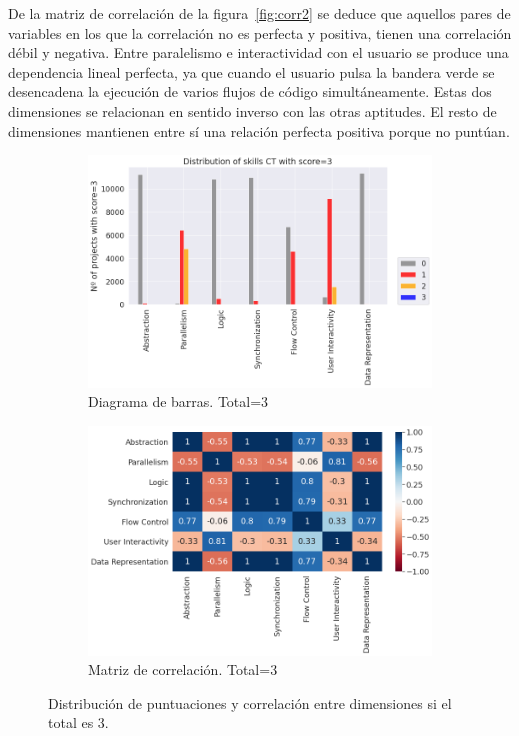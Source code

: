 \documentclass[a4paper, 12pt]{book}
\begin{document}
De la matriz de correlación de la figura~\ref{fig:corr2} se deduce que aquellos pares de variables en los que la correlación no es perfecta y positiva, tienen una correlación débil y negativa. Entre paralelismo e interactividad con el usuario se produce una dependencia lineal perfecta, ya que cuando el usuario pulsa la bandera verde se desencadena la ejecución de varios flujos de código simultáneamente. Estas dos dimensiones se relacionan en sentido inverso con las otras aptitudes. El resto de dimensiones mantienen entre sí una relación perfecta positiva porque no puntúan. 

\begin{figure}
    \centering
    \begin{subfigure}[h]{.49\textwidth} 
        \includegraphics[width=\textwidth]{img/distribucion_3_Scratch}
        \caption{Diagrama de barras. Total=3}
        \label{fig:total3}
    \end{subfigure}       
    \begin{subfigure}[h]{.49\textwidth} 
        \includegraphics[width=\textwidth]{img/corr_3_Scratch}
        \caption{Matriz de correlación. Total=3}
        \label{fig:corr3}
    \end{subfigure}
     \caption{Distribución de puntuaciones y correlación entre dimensiones si el total es 3.}
\end{figure}
\end{document}
